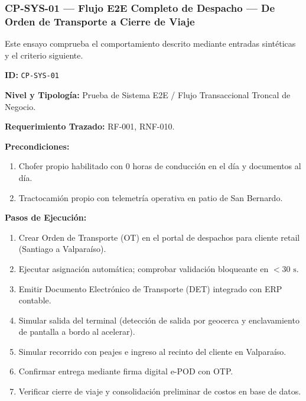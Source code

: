 \subsubsection*{CP-SYS-01 — Flujo E2E Completo de Despacho — De Orden de Transporte a Cierre de Viaje}\label{sec:9-cp-sys-01}
Este ensayo comprueba el comportamiento descrito mediante entradas sintéticas y el criterio siguiente.

\par\noindent\textbf{ID:} \texttt{C\allowbreak{}P\allowbreak{}-\allowbreak{}S\allowbreak{}Y\allowbreak{}S\allowbreak{}-\allowbreak{}0\allowbreak{}1\allowbreak{}}\par
\par\noindent\textbf{Nivel y Tipología:} Prueba de Sistema E2E / Flujo Transaccional Troncal de Negocio.\par
\par\noindent\textbf{Requerimiento Trazado:} RF-001, RNF-010.\par
\par\noindent\textbf{Precondiciones:} \par
\begin{enumerate}
\item Chofer propio habilitado con 0 horas de conducción en el día y documentos al día.
\item Tractocamión propio con telemetría operativa en patio de San Bernardo.
\end{enumerate}
\par\noindent\textbf{Pasos de Ejecución:} \par
\begin{enumerate}
\item Crear Orden de Transporte (OT) en el portal de despachos para cliente retail (Santiago a Valparaíso).
\item Ejecutar asignación automática; comprobar validación bloqueante en \(< 30\text{ s}\).
\item Emitir Documento Electrónico de Transporte (DET) integrado con ERP contable.
\item Simular salida del terminal (detección de salida por geocerca y enclavamiento de pantalla a bordo al acelerar).
\item Simular recorrido con peajes e ingreso al recinto del cliente en Valparaíso.
\item Confirmar entrega mediante firma digital e-POD con OTP.
\item Verificar cierre de viaje y consolidación preliminar de costos en base de datos.
\end{enumerate}

